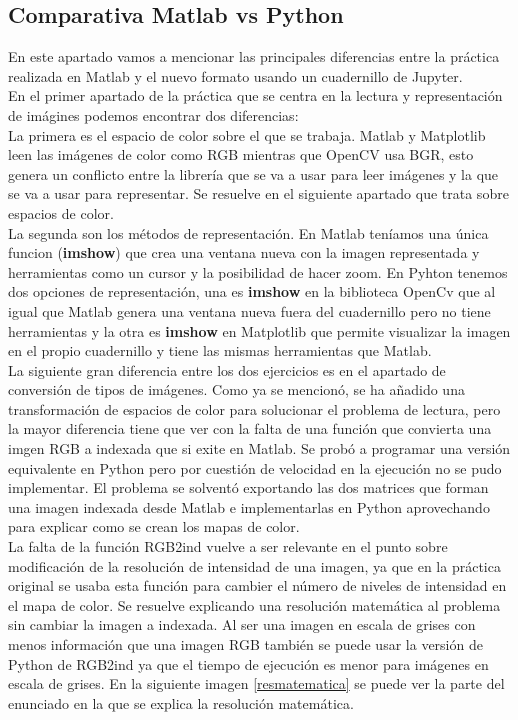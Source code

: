 \documentclass[a4paper,12pt]{report}
\begin{document}
\subsection{Comparativa Matlab vs Python}

En este apartado vamos a mencionar las principales diferencias entre la práctica realizada en Matlab y el nuevo formato usando un cuadernillo de Jupyter.\\

En el primer apartado de la práctica que se centra en la lectura y representación de imágines podemos encontrar dos diferencias:\\

La primera es el espacio de color sobre el que se trabaja. Matlab y Matplotlib leen las imágenes de color como RGB mientras que OpenCV usa BGR, esto genera un conflicto entre la librería que se va a usar para leer imágenes y la que se va a usar para representar. Se resuelve en el siguiente apartado que trata sobre espacios de color.\\

La segunda son los métodos de representación. En Matlab teníamos una única funcion (\textbf{imshow}) que crea una ventana nueva con la imagen representada y herramientas como un cursor y la posibilidad de hacer zoom. En Pyhton tenemos dos opciones de representación, una es \textbf{imshow} en la biblioteca  OpenCv que al igual que Matlab genera una ventana nueva fuera del cuadernillo pero no tiene herramientas y la otra es \textbf{imshow} en Matplotlib que permite visualizar la imagen en el propio cuadernillo y tiene las mismas herramientas que Matlab.\\

La siguiente gran diferencia entre los dos ejercicios es en el apartado de conversión de tipos de imágenes. Como ya se mencionó, se ha añadido una transformación de espacios de color para solucionar el problema de lectura, pero la mayor diferencia tiene que ver con la falta de una función que convierta una imgen RGB a indexada que si exite en Matlab. Se probó a programar una versión equivalente en Python pero por cuestión de velocidad en la ejecución no se pudo implementar. El problema se solventó exportando las dos matrices que forman una imagen indexada desde Matlab  e implementarlas en Python aprovechando para explicar como se crean los mapas de color.\\

La falta de la función RGB2ind vuelve a ser relevante en el punto sobre modificación de la resolución de intensidad de una imagen, ya que en la práctica original se usaba esta función para cambier el número de niveles de intensidad en el mapa de color. Se resuelve explicando una resolución matemática al problema sin cambiar la imagen a indexada. Al ser una imagen en escala de grises con menos información que una imagen RGB también se puede usar la versión de Python de RGB2ind ya que el tiempo de ejecución es menor para imágenes en escala de grises. En la siguiente imagen \ref{resmatematica} se puede ver la parte del enunciado en la que se explica la resolución matemática. 
\end{document}
